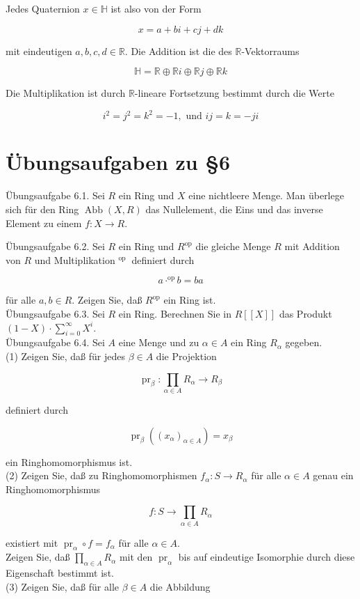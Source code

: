 \documentclass[10pt, letterpaper]{article}
\begin{document}
Jedes Quaternion $x \in \mathbb{H}$ ist also von der Form

$$
x=a+b i+c j+d k
$$

mit eindeutigen $a, b, c, d \in \mathbb{R}$. Die Addition ist die des $\mathbb{R}$-Vektorraums

$$
\mathbb{H}=\mathbb{R} \oplus \mathbb{R} i \oplus \mathbb{R} j \oplus \mathbb{R} k
$$

Die Multiplikation ist durch $\mathbb{R}$-lineare Fortsetzung bestimmt durch die Werte

$$
i^{2}=j^{2}=k^{2}=-1, \text { und } i j=k=-j i
$$

\section*{Übungsaufgaben zu §6}
Übungsaufgabe 6.1. Sei $R$ ein Ring und $X$ eine nichtleere Menge. Man überlege sich für den Ring $\operatorname{Abb}(X, R)$ das Nullelement, die Eins und das inverse Element zu einem $f: X \rightarrow R$.

Übungsaufgabe 6.2. Sei $R$ ein Ring und $R^{\mathrm{op}}$ die gleiche Menge $R$ mit Addition von $R$ und Multiplikation ${ }^{\text {op }}$ definiert durch

$$
a \cdot^{\mathrm{op}} b=b a
$$

für alle $a, b \in R$. Zeigen Sie, daß $R^{\mathrm{op}}$ ein Ring ist.\\
Übungsaufgabe 6.3. Sei $R$ ein Ring. Berechnen Sie in $R[[X]]$ das Produkt $(1-X) \cdot \sum_{i=0}^{\infty} X^{i}$.\\
Übungsaufgabe 6.4. Sei $A$ eine Menge und zu $\alpha \in A$ ein Ring $R_{\alpha}$ gegeben.\\
(1) Zeigen Sie, daß für jedes $\beta \in A$ die Projektion

$$
\operatorname{pr}_{\beta}: \prod_{\alpha \in A} R_{\alpha} \rightarrow R_{\beta}
$$

definiert durch

$$
\operatorname{pr}_{\beta}\left(\left(x_{\alpha}\right)_{\alpha \in A}\right)=x_{\beta}
$$

ein Ringhomomorphismus ist.\\
(2) Zeigen Sie, daß zu Ringhomomorphismen $f_{\alpha}: S \rightarrow R_{\alpha}$ für alle $\alpha \in A$ genau ein Ringhomomorphismus

$$
f: S \rightarrow \prod_{\alpha \in A} R_{\alpha}
$$

existiert mit $\operatorname{pr}_{\alpha} \circ f=f_{\alpha}$ für alle $\alpha \in A$.\\
Zeigen Sie, daß $\prod_{\alpha \in A} R_{\alpha}$ mit den $\operatorname{pr}_{\alpha}$ bis auf eindeutige Isomorphie durch diese Eigenschaft bestimmt ist.\\
(3) Zeigen Sie, daß für alle $\beta \in A$ die Abbildung
\end{document}
